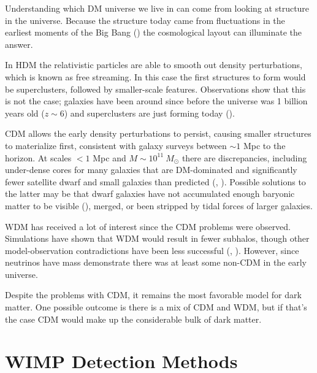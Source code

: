 Understanding which DM universe we live in can come from looking at structure in the universe.  Because the structure
today came from fluctuations in the earliest moments of the Big Bang () the cosmological layout
can illuminate the answer.

In HDM the relativistic particles are able to smooth out density perturbations, which is known as free
streaming.  In this case the first structures to form would be superclusters, followed by smaller-scale
features.  Observations show that this is not the case; galaxies have been around since before the universe
was 1 billion years old ($z \sim 6$) and superclusters are just forming today ().

CDM allows the early density perturbations to persist, causing smaller structures to materialize first,
consistent with galaxy surveys between $\sim 1$ Mpc to the horizon.  At scales $< 1$ Mpc and
$M \sim 10^{11} \ M_{\odot}$ there are discrepancies, including under-dense cores for many galaxies that are DM-dominated
and significantly fewer satellite dwarf and small galaxies than predicted (, ).  Possible
solutions to the latter may be that dwarf galaxies have not accumulated enough baryonic matter to be visible
(), merged, or been stripped by tidal forces of larger galaxies.

WDM has received a lot of interest since the CDM problems were observed.  Simulations have shown that
WDM would result in fewer subhalos, though other model-observation contradictions have been less
successful (, ).  However, since neutrinos have mass demonstrate there
was at least some non-CDM in the early universe.

Despite the problems with CDM, it remains the most favorable model for dark matter.  One possible outcome is
there is a mix of CDM and WDM, but if that's the case CDM would make up the considerable bulk of dark matter.


\section[WIMP Detection Methods][WIMP Detection Methods]{WIMP Detection Methods}
\label{sec:detection}

